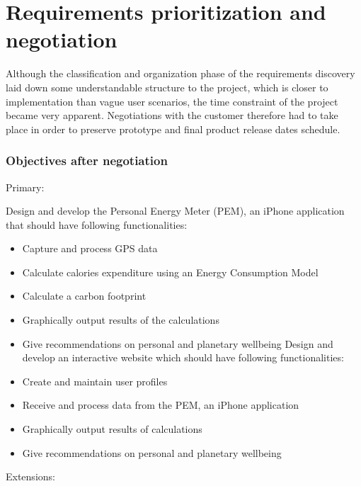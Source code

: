 \documentclass[12pt, a4paper]{report}   %
\begin{document}
\section{Requirements prioritization and \\ negotiation}
Although the classification and organization phase of the requirements discovery laid down some understandable structure to the project, which is closer to implementation than vague user scenarios, the time constraint of the project became very apparent. Negotiations with the customer therefore had to take place in order to preserve prototype and final product release dates schedule.

\subsubsection*{Objectives after negotiation}
Primary:
	\begin{itemize}
		Design and develop the Personal Energy Meter (PEM), an iPhone application that 		should 	have following functionalities:
	\end{itemize}
	\begin{itemize}
		\begin{itemize}
			\item Capture and process GPS data
			\item Calculate calories expenditure using an Energy Consumption Model
			\item Calculate a carbon footprint
			\item Graphically output results of the calculations
			\item Give recommendations on personal and planetary wellbeing
Design and develop an interactive website which should have following functionalities:
			\item Create and maintain user profiles
			\item Receive and process data from the PEM, an iPhone application
			\item Graphically output results of calculations
			\item Give recommendations on personal and planetary wellbeing
		\end{itemize}
	\end{itemize}
Extensions: 
\end{document}
